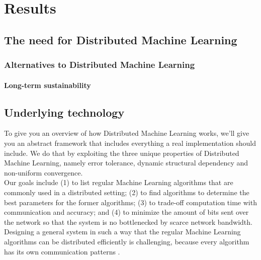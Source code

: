 \section{Results}

\subsection{The need for Distributed Machine Learning}
\subsubsection{Alternatives to Distributed Machine Learning}
\paragraph{Long-term sustainability}










\subsection{Underlying technology}
To give you an overview of how Distributed Machine Learning works, we'll give you an abstract framework that includes everything a real implementation should include. We do that by exploiting the three unique properties of Distributed Machine Learning, namely error tolerance, dynamic structural dependency and non-uniform convergence.\cite{Xing16}\\
Our goals include (1) to list regular Machine Learning algorithms that are commonly used in a distributed setting; (2) to find algorithms to determine the best parameters for the former algorithms; (3) to trade-off computation time with communication and accuracy; and (4) to minimize the amount of bits sent over the network so that the system is no bottlenecked by scarce network bandwidth.\\
Designing a general system in such a way that the regular Machine Learning algorithms can be distributed efficiently is challenging, because every algorithm has its own communication patterns \cite{Jia14}\cite{Newman09}\cite{Rich13}\cite{Smola10}\cite{Takac13}\cite{Tsi12}.

